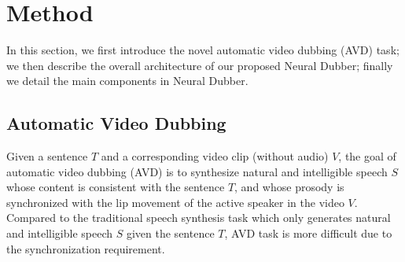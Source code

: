 \documentclass{article}
\begin{document}
\section{Method}
In this section, we first introduce the novel automatic video dubbing (AVD) task; 
we then describe the overall architecture of our proposed Neural Dubber; 
finally we detail the main components in Neural Dubber. 

\subsection{Automatic Video Dubbing}

Given a sentence $T$ and a corresponding video clip (without audio) $V$, the goal of automatic video dubbing (AVD) is to synthesize natural and intelligible speech $S$ whose content is consistent with the sentence $T$, and whose prosody is synchronized with the lip movement of the active speaker in the video $V$.
Compared to the traditional speech synthesis task which only generates natural and intelligible speech $S$ given the sentence $T$, AVD task is more difficult due to the synchronization requirement.



\end{document}
